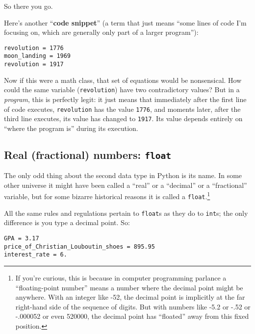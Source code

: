 So there you go.

Here's another ``\textbf{code snippet}'' (a term that just means ``some lines
of code I'm focusing on, which are generally only part of a larger program''):

\begin{Verbatim}[fontsize=\small,samepage=true,frame=single,framesep=3mm]
revolution = 1776
moon_landing = 1969
revolution = 1917
\end{Verbatim}

Now if this were a math class, that set of equations would be nonsensical. How
could the same variable (\texttt{revolution}) have two contradictory values?
But in a \textit{program}, this is perfectly legit: it just means that
immediately after the first line of code executes, \texttt{revolution} has the
value \texttt{1776}, and moments later, after the third line executes, its
value has changed to \texttt{1917}. Its value depends entirely on ``where the
program is'' during its execution.

\subsection{Real (fractional) numbers: \texttt{float}}


The only odd thing about the second data type in Python is its name. In some
other universe it might have been called a ``real'' or a ``decimal'' or a
``fractional'' variable, but for some bizarre historical reasons it is called a
\texttt{float}.\footnote{If you're curious, this is because in computer
programming parlance a ``floating-point number'' means a number where the
decimal point might be anywhere. With an integer like -52, the decimal point is
implicitly at the far right-hand side of the sequence of digits. But with
numbers like -5.2 or -.52 or -.000052 or even 520000, the decimal point has
``floated'' away from this fixed position.}

All the same rules and regulations pertain to \texttt{float}s as they do to
\texttt{int}s; the only difference is you type a decimal point. So:

\begin{Verbatim}[fontsize=\small,samepage=true,frame=single,framesep=3mm]
GPA = 3.17
price_of_Christian_Louboutin_shoes = 895.95
interest_rate = 6.
\end{Verbatim}

